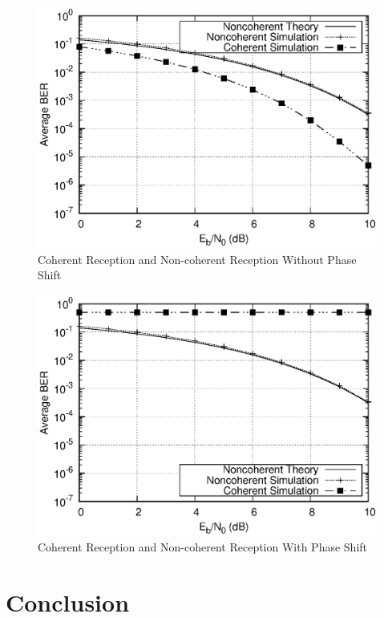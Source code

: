 \documentclass[technicalreport]{ieicej}
\begin{document}
\begin{figure}[tbp]
	\begin{center}
		\vspace{0cm}
		\includegraphics[width=\linewidth,clip]{fig/without_shift.eps}
		\caption{Coherent Reception and Non-coherent Reception Without Phase Shift}
		\label{fig:sample}
	\end{center}
\end{figure}

\begin{figure}[tbp]
	\begin{center}
		\vspace{0cm}
		\includegraphics[width=\linewidth,clip]{fig/phase_shift.eps}
		\caption{Coherent Reception and Non-coherent Reception With Phase Shift}
		\label{fig:sample}
	\end{center}
\end{figure}

\section{Conclusion}




\end{document}
